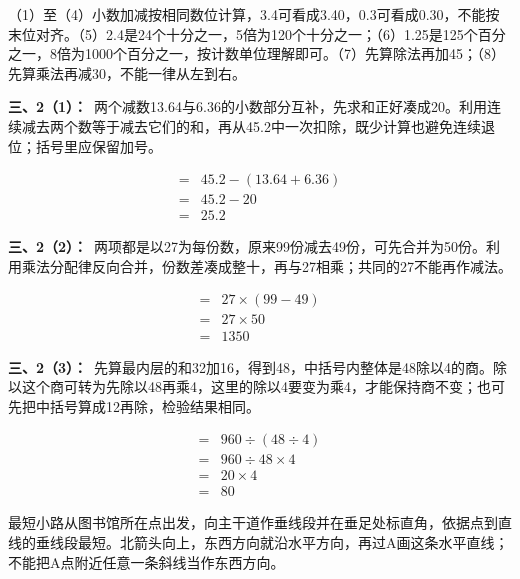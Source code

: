\documentclass[multi=snippet,border=0pt]{standalone}
\newenvironment{snippet}[3]{\begin{minipage}{#1bp}\color{answerred}\fontsize{#2}{#3}\selectfont\raggedright}{\end{minipage}}
\begin{document}
\begin{snippet}{505}{11.5}{14}（1）至（4）小数加减按相同数位计算，3.4可看成3.40，0.3可看成0.30，不能按末位对齐。（5）2.4是24个十分之一，5倍为120个十分之一；（6）1.25是125个百分之一，8倍为1000个百分之一，按计数单位理解即可。（7）先算除法再加45；（8）先算乘法再减30，不能一律从左到右。\end{snippet}
\begin{snippet}{505}{11.5}{14}\textbf{三、2（1）：}\ 两个减数13.64与6.36的小数部分互补，先求和正好凑成20。利用连续减去两个数等于减去它们的和，再从45.2中一次扣除，既少计算也避免连续退位；括号里应保留加号。\end{snippet}
\begin{snippet}{166.9}{10.5}{12.8}\[\begin{aligned}={}&45.2-(13.64+6.36)\\={}&45.2-20\\={}&25.2\end{aligned}\]\end{snippet}
\begin{snippet}{505}{11.5}{14}\textbf{三、2（2）：}\ 两项都是以27为每份数，原来99份减去49份，可先合并为50份。利用乘法分配律反向合并，份数差凑成整十，再与27相乘；共同的27不能再作减法。\end{snippet}
\begin{snippet}{163.9}{10.5}{12.8}\[\begin{aligned}={}&27\times(99-49)\\={}&27\times50\\={}&1350\end{aligned}\]\end{snippet}
\begin{snippet}{505}{11.5}{14}\textbf{三、2（3）：}\ 先算最内层的和32加16，得到48，中括号内整体是48除以4的商。除以这个商可转为先除以48再乘4，这里的除以4要变为乘4，才能保持商不变；也可先把中括号算成12再除，检验结果相同。\end{snippet}
\begin{snippet}{192.233}{10.5}{12.8}\[\begin{aligned}={}&960\div(48\div4)\\={}&960\div48\times4\\={}&20\times4\\={}&80\end{aligned}\]\end{snippet}
\begin{snippet}{505}{11.5}{14}最短小路从图书馆所在点出发，向主干道作垂线段并在垂足处标直角，依据点到直线的垂线段最短。北箭头向上，东西方向就沿水平方向，再过A画这条水平直线；不能把A点附近任意一条斜线当作东西方向。\end{snippet}
\end{document}
